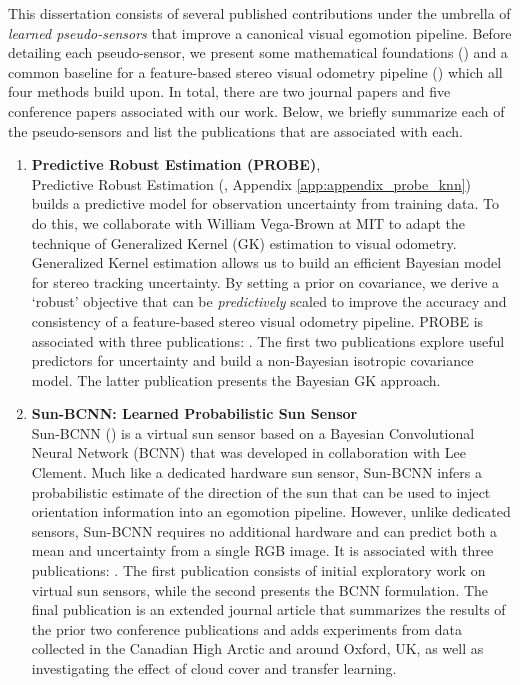 This dissertation consists of several published contributions under the umbrella of \textit{learned pseudo-sensors} that improve a canonical visual egomotion pipeline. Before detailing each pseudo-sensor, we present some mathematical foundations () and a common baseline for a feature-based stereo visual odometry pipeline () which all four methods build upon. In total, there are two journal papers and five conference papers associated with our work. Below, we briefly summarize each of the pseudo-sensors and list the publications that are associated with each.
\begin{enumerate}
\item \textbf{Predictive Robust Estimation (PROBE)},  \\
Predictive Robust Estimation (, Appendix \ref{app:appendix_probe_knn}) builds a predictive model for observation uncertainty from training data. To do this, we collaborate with William Vega-Brown at MIT to adapt the technique of Generalized Kernel (GK) estimation \citep{Vega-Brown2014-sb} to visual odometry. Generalized Kernel estimation allows us to build an efficient Bayesian model for stereo tracking uncertainty. By setting a prior on covariance, we derive a `robust' objective that can be \textit{predictively} scaled to improve the accuracy and consistency of a feature-based stereo visual odometry pipeline. PROBE is associated with three publications: \cite{2015_Peretroukhin_PROBE,2015_Peretroukhin_Get,Peretroukhin2016-om}. The first two publications explore useful predictors for uncertainty and build a non-Bayesian isotropic covariance model. The latter publication presents the Bayesian GK approach.

\item \textbf{Sun-BCNN: Learned Probabilistic Sun Sensor} \\ 
Sun-BCNN () is a virtual sun sensor based on a Bayesian Convolutional Neural Network (BCNN) that was developed in collaboration with Lee Clement. Much like a dedicated hardware sun sensor, Sun-BCNN infers a probabilistic estimate of the direction of the sun that can be used to inject orientation information into an egomotion pipeline. However, unlike dedicated sensors, Sun-BCNN requires no additional hardware and can predict both a mean and uncertainty from a single RGB image. It is associated with three publications: \cite{2017_Clement_Improving,2017_Peretroukhin_Reducing,2018_Peretroukhin_Inferring}. The first publication consists of initial exploratory work on virtual sun sensors, while the second presents the BCNN formulation. The final publication is an extended journal article that summarizes the results of the prior two conference publications and adds experiments from data collected in the Canadian High Arctic and around Oxford, UK, as well as investigating the effect of cloud cover and transfer learning. 



\end{enumerate}
